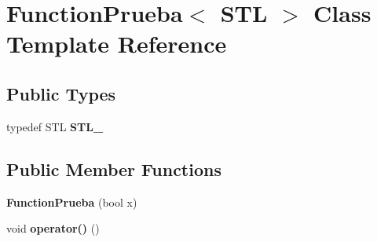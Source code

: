 \hypertarget{class_function_prueba}{\section{Function\-Prueba$<$ S\-T\-L $>$ Class Template Reference}
\label{class_function_prueba}
}
\subsection*{Public Types}
\begin{DoxyCompactItemize}
\item 
\hypertarget{class_function_prueba_a90cb9d1930876499f424b58b1c2f8520}{typedef S\-T\-L {\bfseries S\-T\-L\-\_\-}}\label{class_function_prueba_a90cb9d1930876499f424b58b1c2f8520}

\end{DoxyCompactItemize}
\subsection*{Public Member Functions}
\begin{DoxyCompactItemize}
\item 
\hypertarget{class_function_prueba_a97ef57168bfbbf79b31fdb1ef045eca9}{{\bfseries Function\-Prueba} (bool x)}\label{class_function_prueba_a97ef57168bfbbf79b31fdb1ef045eca9}

\item 
\hypertarget{class_function_prueba_a80c5b2ade210343ff384b05d04c42c0d}{void {\bfseries operator()} ()}\label{class_function_prueba_a80c5b2ade210343ff384b05d04c42c0d}

\end{DoxyCompactItemize}

